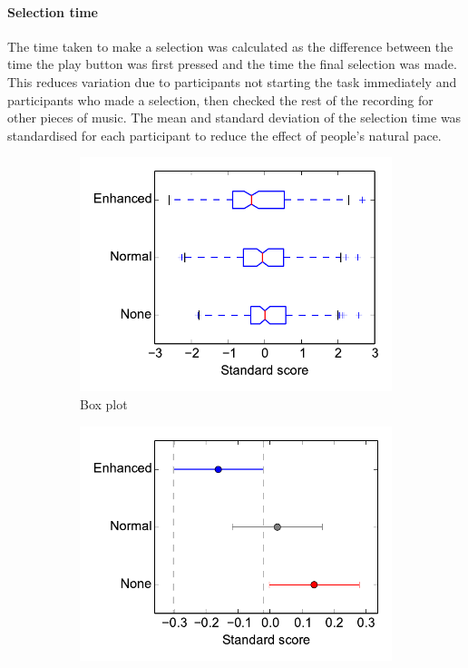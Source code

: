 \paragraph{Selection time}
The time taken to make a selection was calculated as the difference between the time the play button was first pressed
and the time the final selection was made. This reduces variation due to participants not starting the task immediately
and participants who made a selection, then checked the rest of the recording for other pieces of music. The mean and
standard deviation of the selection time was standardised for each participant to reduce the effect of people's natural
pace.

\begin{figure}[ht]
\centering
\begin{subfigure}{.5\textwidth}
  \centering
  \includegraphics[width=\textwidth]{figs/playstart-to-selectend-std.pdf}
  \caption{Box plot}
  \label{fig:selecttimebox}
\end{subfigure}%
\begin{subfigure}{.5\textwidth}
  \centering
  \includegraphics[width=\linewidth]{figs/playstart-to-selectend-std-tukey95.pdf}

\end{subfigure}
\end{figure}
